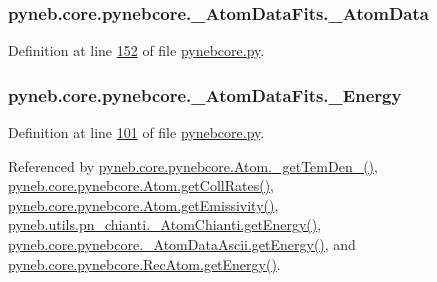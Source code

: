 \hypertarget{classpyneb_1_1core_1_1pynebcore_1_1___atom_data_fits_a778ab4d0dcd50a9d2f5aa54da07b51cc}{
\subsubsection[{\-\_\-\-Atom\-Data}]{\setlength{\rightskip}{0pt plus 5cm}pyneb.\-core.\-pynebcore.\-\_\-\-Atom\-Data\-Fits.\-\_\-\-Atom\-Data\hspace{0.3cm}{\ttfamily [private]}}}\label{classpyneb_1_1core_1_1pynebcore_1_1___atom_data_fits_a778ab4d0dcd50a9d2f5aa54da07b51cc}


Definition at line \hyperlink{pynebcore_8py_source_l00152}{152} of file \hyperlink{pynebcore_8py_source}{pynebcore.\-py}.

\hypertarget{classpyneb_1_1core_1_1pynebcore_1_1___atom_data_fits_a465451be78113fc2ee30cf3ddabceadf}{
\subsubsection[{\-\_\-\-Energy}]{\setlength{\rightskip}{0pt plus 5cm}pyneb.\-core.\-pynebcore.\-\_\-\-Atom\-Data\-Fits.\-\_\-\-Energy\hspace{0.3cm}{\ttfamily [private]}}}\label{classpyneb_1_1core_1_1pynebcore_1_1___atom_data_fits_a465451be78113fc2ee30cf3ddabceadf}


Definition at line \hyperlink{pynebcore_8py_source_l00101}{101} of file \hyperlink{pynebcore_8py_source}{pynebcore.\-py}.



Referenced by \hyperlink{pynebcore_8py_source_l01869}{pyneb.\-core.\-pynebcore.\-Atom.\-\_\-get\-Tem\-Den\-\_()}, \hyperlink{pynebcore_8py_source_l01394}{pyneb.\-core.\-pynebcore.\-Atom.\-get\-Coll\-Rates()}, \hyperlink{pynebcore_8py_source_l01782}{pyneb.\-core.\-pynebcore.\-Atom.\-get\-Emissivity()}, \hyperlink{pn__chianti_8py_source_l00366}{pyneb.\-utils.\-pn\-\_\-chianti.\-\_\-\-Atom\-Chianti.\-get\-Energy()}, \hyperlink{pynebcore_8py_source_l00537}{pyneb.\-core.\-pynebcore.\-\_\-\-Atom\-Data\-Ascii.\-get\-Energy()}, and \hyperlink{pynebcore_8py_source_l02927}{pyneb.\-core.\-pynebcore.\-Rec\-Atom.\-get\-Energy()}.

